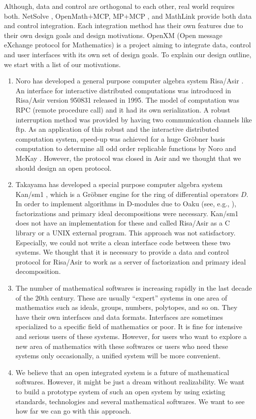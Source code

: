 Although, data and control are orthogonal to each other,
real world requires both.
NetSolve \cite{netsolve}, OpenMath$+$MCP, MP$+$MCP \cite{iamc},
and MathLink \cite{mathlink} provide both data and control integration.
Each integration method has their own features due to their
own design goals and design motivations.
OpenXM (Open message eXchange protocol for Mathematics)
is a project aiming to integrate data, control and user interfaces
with its own set of design goals.
To explain our design outline, we start with a list of
our motivations.
\begin{enumerate}
\item Noro has developed a general
purpose computer algebra system Risa/Asir \cite{asir}.
An interface for interactive distributed computations was introduced
in Risa/Asir version 950831 released in 1995.
The model of computation was RPC (remote procedure call)
and it had its own serialization.
A robust interruption method was provided by having two communication channels
like ftp.
As an application of this robust and the interactive distributed computation
system, speed-up was achieved for a huge Gr\"obner basis computation
to determine all odd order replicable functions 
by Noro and McKay \cite{noro-mckay}.
However, the protocol was closed in Asir and we thought that we should
design an open protocol.
\item Takayama has developed
a special purpose computer algebra system Kan/sm1 \cite{kan},
which is a Gr\"obner engine for the ring of differential operators $D$. 
In order to implement algorithms in D-modules due to Oaku 
(see, e.g., \cite{sst-book}),
factorizations and primary ideal decompositions were necessary.
Kan/sm1 does not have an implementation for these and called
Risa/Asir as a C library or a UNIX external program.
This approach was not satisfactory.
Especially, we could not write a clean interface code between these
two systems.
We thought that it is necessary to provide a data and control protocol
for Risa/Asir to work as a server of factorization and primary ideal
decomposition.
\item The number of mathematical softwares is increasing rapidly in the last
decade of the 20th century.
These are usually ``expert'' systems in one area of mathematics
such as ideals, groups, numbers, polytopes, and so on.
They have their own interfaces and data formats.
Interfaces are sometimes specialized to a specific field of mathematics
or poor.
It is fine for intensive and serious users of these systems.
However, for users who want to explore a new area of mathematics with these
softwares or users who need these systems only occasionally,
a unified system will be more convenient.

\item  We believe that an open integrated system is a future of mathematical
softwares.
However, it might be just a dream without realizability.
We want to build a prototype system of such an open system by using
existing standards, technologies and several mathematical softwares.
We want to see how far we can go with this approach.
\end{enumerate}

